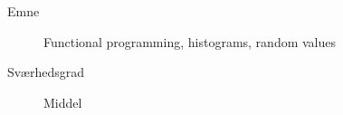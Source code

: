 \begin{description}
\item[Emne] Functional programming, histograms, random values
\item[Sværhedsgrad] Middel
\end{description}

